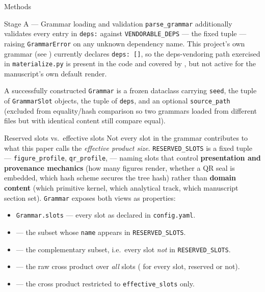 \documentclass[
  ignorenonframetext,
]{beamer}
\providecommand{\tightlist}{%
  \setlength{\itemsep}{0pt}\setlength{\parskip}{0pt}}
\begin{document}
\begin{frame}{Methods}
\begin{block}{Stage A --- Grammar loading and validation}
\texttt{parse\_grammar} additionally validates every entry in
\texttt{deps:} against \texttt{VENDORABLE\_DEPS} --- the fixed tuple
--- raising \texttt{GrammarError} on any unknown dependency name. This
project's own grammar (see ) currently
declares \texttt{deps:\ {[}{]}}, so the deps-vendoring path exercised in
\texttt{materialize.py} is present in the code and covered by
, but not active for the manuscript's
own default render.

A successfully constructed \texttt{Grammar} is a frozen dataclass
carrying \texttt{seed}, the tuple of \texttt{GrammarSlot} objects, the
tuple of \texttt{deps}, and an optional \texttt{source\_path} (excluded
from equality/hash comparison so two grammars loaded from different
files but with identical content still compare equal).
\end{block}

\begin{block}{Reserved slots vs.~effective slots}
\protect{}\label{reserved-slots-vs.-effective-slots}
Not every slot in the grammar contributes to what this paper calls the
\emph{effective product size}. \texttt{RESERVED\_SLOTS} is a fixed tuple
--- \texttt{figure\_profile}, \texttt{qr\_profile},
 --- naming slots that control
\textbf{presentation and provenance mechanics} (how many figures render,
whether a QR seal is embedded, which hash scheme secures the tree hash)
rather than \textbf{domain content} (which primitive kernel, which
analytical track, which manuscript section set). \texttt{Grammar}
exposes both views as properties:

\begin{itemize}
\tightlist
\item
  \texttt{Grammar.slots} --- every slot as declared in
  \texttt{config.yaml}.
\item
   --- the subset whose \texttt{name}
  appears in \texttt{RESERVED\_SLOTS}.
\item
   --- the complementary subset,
  i.e.~every slot \emph{not} in \texttt{RESERVED\_SLOTS}.
\item
   --- the raw cross product over
  \emph{all} slots ( for every slot,
  reserved or not).
\item
   --- the cross product
  restricted to \texttt{effective\_slots} only.
\end{itemize}


\end{block}
\end{frame}
\end{document}
